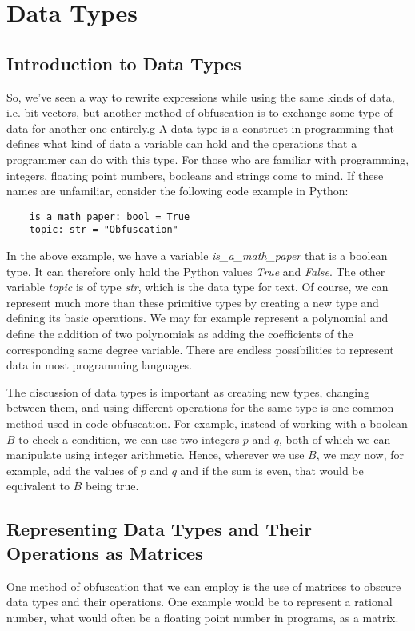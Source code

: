 \section{Data Types}
\subsection{Introduction to Data Types}
So, we've seen a way to rewrite expressions while using the same kinds of data, 
i.e. bit vectors, but another method of obfuscation is to exchange some type 
of data for another one entirely.g
A data type is a construct in programming that defines what kind of data a
variable can hold and the operations that a programmer can do with this type.
For those who are familiar with programming, integers, floating point numbers,
booleans and strings come to mind. If these names are unfamiliar, consider the
following code example in Python:
\begin{verbatim}
    is_a_math_paper: bool = True
    topic: str = "Obfuscation"
\end{verbatim}
In the above example, we have a variable \textit{is\_a\_math\_paper} that is a
boolean type. It can therefore only hold the Python values \textit{True} and
\textit{False}. The other variable \textit{topic} is of type \textit{str},
which is the data
type for text. Of course, we can represent much more than
these primitive types by creating a new type and defining its basic
operations. We may for example represent a polynomial and define the addition
of two polynomials as adding the coefficients of the corresponding
same degree variable. There are endless possibilities to represent data in
most programming languages.

The discussion of data types is important as creating new types, changing
between them, and using different operations for the same type is one common
method used in code obfuscation. For example, instead of working with a boolean
$ B $ to check a condition, we can use two integers $ p $ and $ q $, both of
which we can manipulate using integer arithmetic. Hence, wherever we use $ B $,
we may now, for example, add the values of $ p $ and $ q $ and if the sum is
even, that would be equivalent to $ B $ being true.

\subsection{Representing Data Types and Their Operations as Matrices}
One method of obfuscation that we can employ is the use of matrices to obscure
data types and their operations. One example would be to represent a
rational number, what would often be a floating point number in programs, as a
matrix.

